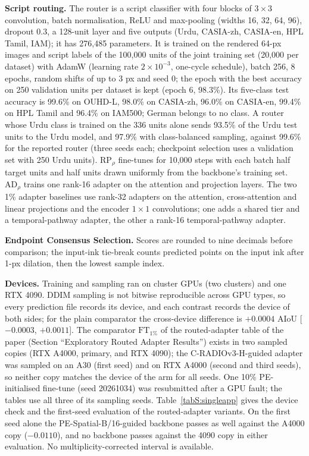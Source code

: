 \documentclass[10pt,a4paper]{article}
\newcommand{\FT}[1]{\mathrm{FT}_{#1}}
\newcommand{\RP}[1]{\mathrm{RP}_{#1}}
\newcommand{\AD}[1]{\mathrm{AD}_{#1}}
\begin{document}
\textbf{Script routing.} The router is a script classifier with four blocks of $3\times3$ convolution, batch normalisation, ReLU and max-pooling (widths 16, 32, 64, 96), dropout 0.3, a 128-unit layer and five outputs (Urdu, CASIA-zh, CASIA-en, HPL Tamil, IAM); it has 276,485 parameters. It is trained on the rendered 64-px images and script labels of the 100,000 units of the joint training set (20,000 per dataset) with AdamW (learning rate $2\times10^{-3}$, one-cycle schedule), batch 256, 8 epochs, random shifts of up to 3 px and seed 0; the epoch with the best accuracy on 250 validation units per dataset is kept (epoch 6, 98.3\%). Its five-class test accuracy is 99.6\% on OUHD-L, 98.0\% on CASIA-zh, 96.0\% on CASIA-en, 99.4\% on HPL Tamil and 96.4\% on IAM500; German belongs to no class. A router whose Urdu class is trained on the 336 units alone sends 93.5\% of the Urdu test units to the Urdu model, and 97.9\% with class-balanced sampling, against 99.6\% for the reported router (three seeds each; checkpoint selection uses a validation set with 250 Urdu units). $\RP{\rho}$ fine-tunes for 10,000 steps with each batch half target units and half units drawn uniformly from the backbone's training set. $\AD{\rho}$ trains one rank-16 adapter on the attention and projection layers. The two 1\% adapter baselines use rank-32 adapters on the attention, cross-attention and linear projections and the encoder $1\times1$ convolutions; one adds a shared tier and a temporal-pathway adapter, the other a rank-16 temporal-pathway adapter.

\textbf{Endpoint Consensus Selection.} Scores are rounded to nine decimals before comparison; the input-ink tie-break counts predicted points on the input ink after 1-px dilation, then the lowest sample index.

\textbf{Devices.} Training and sampling ran on cluster GPUs (two clusters) and one RTX 4090. DDIM sampling is not bitwise reproducible across GPU types, so every prediction file records its device, and each contrast records the device of both sides; for the plain comparator the cross-device difference is $+0.0004$ AIoU [$-0.0003$, $+0.0011$]. The comparator $\FT{1\%}$ of the routed-adapter table of the paper (Section ``Exploratory Routed Adapter Results'') exists in two sampled copies (RTX A4000, primary, and RTX 4090); the C-RADIOv3-H-guided adapter was sampled on an A30 (first seed) and on RTX A4000 (second and third seeds), so neither copy matches the device of the arm for all seeds. One 10\% PE-initialised fine-tune (seed 20261034) was resubmitted after a GPU fault; the tables use all three of its sampling seeds. Table~\ref{tabS:singleapp} gives the device check and the first-seed evaluation of the routed-adapter variants. On the first seed alone the PE-Spatial-B/16-guided backbone passes as well against the A4000 copy ($-0.0110$), and no backbone passes against the 4090 copy in either evaluation. No multiplicity-corrected interval is available.
\end{document}

